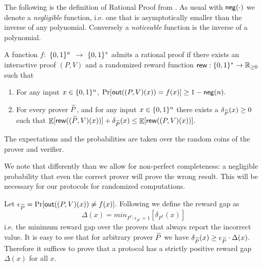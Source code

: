 The following is the definition of Rational Proof from \cite{am}. As usual with $\mathsf{neg}(\cdot)$ we denote a {\em negligible} function, i.e. one that is asymptotically smaller than the inverse of any polynomial. Conversely a {\em noticeable} function is the inverse of a polynomial. 


\noindent
\begin{definition}
\label{def:RP-delta}
\label{def:RP}
A function $f:$ $\{0, 1\}^n$ $\to$ $\{0, 1\}^*$ admits a rational proof if there exists an interactive proof $(P,V)$ and a randomized reward function
$\mathsf{rew} : \{0, 1\}^{*} \to \mathbb{R}_{\geq 0}$ such that

\begin{enumerate}
\item \label{item:completeness} For any input $x \in 
\{0, 1\}^n$, $\Pr[\mathsf{out}((P,V)(x)) = f(x)] \geq 1 - \mathsf{neg}(n).$

\item For every prover $\widetilde{P}$, and for any input $x \in 
\{0, 1\}^n$ there exists a $\delta_{\widetilde{P}}(x) \geq 0$ such that 
$ \mathop{\mathbb{E}}[\mathsf{rew}((\widetilde{P},V)(x))] + \delta_{\widetilde{P}}(x) \leq \mathop{\mathbb{E}}[\mathsf{rew}((P,V)(x))]. $
\end{enumerate}
The expectations and the probabilities are taken over the random coins of the prover and verifier.
\end{definition} 
We note that differently than \cite{am} we allow for non-perfect completeness: a negligible probability that even the correct prover will prove the wrong result. This will be necessary for our protocols for randomized computations. 


\medskip
\noindent
Let $\epsilon_{\widetilde{P}} = \Pr[\mathsf{out}((P,V)(x)) \neq f(x)]$. 
Following \cite{ratargs} we define the {\sf reward gap} as 
\[ \Delta(x) = min_{P^* : \epsilon_{P^*}=1}[\delta_{P^*}(x)]  \]
i.e. the minimum reward gap over the provers that always report the incorrect value. 
It is easy to see that for arbitrary prover $\widetilde{P}$ we have $\delta_{\widetilde{P}}(x) \geq 
\epsilon_{\widetilde{P}} \cdot \Delta(x)$. Therefore it suffices to prove that a protocol has 
a strictly positive reward gap $\Delta(x)$ for all $x$. 



